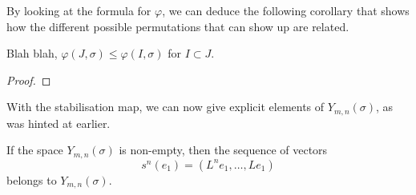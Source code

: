 By looking at the formula for $\varphi$, we can deduce the following
corollary that shows how the different possible permutations that can
show up are related.

\begin{corollary}
  Blah blah, $\varphi(J,\sigma) \leq \varphi(I,\sigma)$ for $I \subset
  J$. 
\end{corollary}
\begin{proof}
  
\end{proof}

With the stabilisation map, we can now give explicit elements of
$Y_{m,n}(\sigma)$, as was hinted at earlier.

\begin{theorem}
  \label{thm:eksplicit-element}
  If the space $Y_{m,n}(\sigma)$ is non-empty, then the sequence of
  vectors
  \[ s^n(e_1) = \left(L^n e_1,\dots,Le_1\right) \]
  belongs to $Y_{m,n}(\sigma)$.
\end{theorem}
